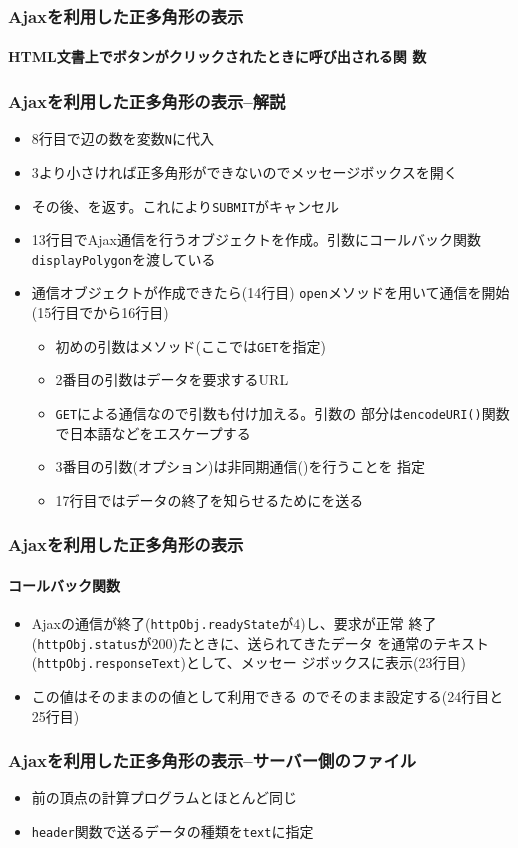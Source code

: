 \begin{frame}[containsverbatim]
 \frametitle{Ajaxを利用した正多角形の表示}
 \framesubtitle{HTML文書上でボタンがクリックされたときに呼び出される関
 数}
\end{frame}
\begin{frame}[containsverbatim]
 \frametitle{Ajaxを利用した正多角形の表示--解説}
 \begin{itemize}
	\item 8行目で辺の数を変数\texttt{N}に代入
	\item 3より小さければ正多角形ができないのでメッセージボックスを開く
	\item その後、を返す。これにより\texttt{SUBMIT}がキャンセル
  \item 13行目でAjax通信を行うオブジェクトを作成。引数にコールバック関数
        \texttt{displayPolygon}を渡している
  \item 通信オブジェクトが作成できたら(14行目)
        \texttt{open}メソッドを用いて通信を開始(15行目でから16行目)
        \begin{itemize}
  \item 初めの引数はメソッド(ここでは\texttt{GET}を指定)
  \item 2番目の引数はデータを要求するURL
  \item \texttt{GET}による通信なので引数も付け加える。引数の
        部分は\texttt{encodeURI()}関数で日本語などをエスケープする
  \item 3番目の引数(オプション)は非同期通信()を行うことを
        指定
  \item 17行目ではデータの終了を知らせるためにを送る
        \end{itemize}
 \end{itemize}
\end{frame}
\begin{frame}[containsverbatim]
 \frametitle{Ajaxを利用した正多角形の表示}
 \framesubtitle{コールバック関数}
 \begin{itemize}
  \item Ajaxの通信が終了(\texttt{httpObj.readyState}が$4$)し、要求が正常
        終了(\texttt{httpObj.status}が$200$)たときに、送られてきたデータ
        を通常のテキスト(\texttt{httpObj.responseText})として、メッセー
        ジボックスに表示(23行目)
  \item この値はそのままのの値として利用できる
        のでそのまま設定する(24行目と25行目)
 \end{itemize}
\end{frame}
\begin{frame}[containsverbatim]
 \frametitle{Ajaxを利用した正多角形の表示--サーバー側のファイル}
\begin{itemize}
 \item 前の頂点の計算プログラムとほとんど同じ
 \item \texttt{header}関数で送るデータの種類を\texttt{text}に指定
\end{itemize}
\end{frame}
